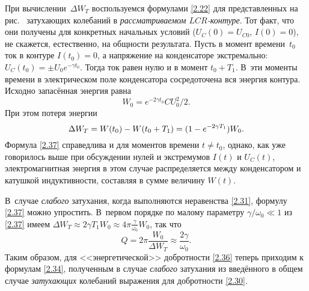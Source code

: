 При вычислении~$\Delta W_T$
воспользуемся формулами \eqref{2.22} для представленных на рис.~
затухающих колебаний в \emph{рассматриваемом $LCR$-контуре}. Тот факт, что
они получены для конкретных начальных условий ($U_C(0)=U_{C0}$, $I(0)=0$),
не скажется, естественно, на общности результата. Пусть в момент времени~$t_0$ ток
в контуре $I(t_0)=0$, а напряжение на конденсаторе экстремально: $U_C(t_0)=\pm
U_{0}e^{-\gamma t_0}$. Тогда ток равен нулю и в момент $t_0+T_1$. В~эти моменты
времени в электрическом поле конденсатора сосредоточена вся энергия контура. 
Исходно запасённая энергия равна
\begin{equation*}
			 W_0 = e^{-2\gamma t_0}CU_{0}^2/2.
\end{equation*}
При этом потеря энергии
\begin{equation}
	\eqmark{2.37}
			 \Delta W_T = W(t_0)-W(t_0+T_1)=(1-e^{-2\gamma T_1})W_0.
\end{equation}
Формула \eqref{2.37} справедлива и для моментов времени $t\ne t_0$, однако, 
как уже говорилось выше при обсуждении нулей и экстремумов $I(t)$ и $U_C(t)$,
электромагнитная энергия в этом случае распределяется между конденсатором и
катушкой индуктивности, составляя в сумме величину $W(t)$.

В~случае \emph{слабого} затухания, когда выполняются неравенства
\eqref{2.31}, формулу \eqref{2.37} можно упростить. В~первом порядке по малому
параметру $\gamma/\omega_0 \ll 1$
из \eqref{2.37} имеем 
$\Delta W_T \approx 2\gamma T_1 W_0 \approx 4\pi \frac{\gamma}{\omega_0} W_0$, так что
\begin{equation}
Q = 2\pi \frac{W_0}{\Delta W_T} \approx \frac{2\gamma}{\omega_0}.
\end{equation}
Таким образом, для <<энергетической>> добротности \eqref{2.36} теперь 
приходим к формулам \eqref{2.34}, полученным в случае \emph{слабого} 
затухания из введённого в общем случае \emph{затухающих} колебаний 
выражения для добротности \eqref{2.30}.

